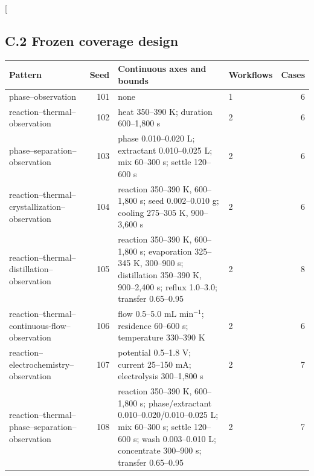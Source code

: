 \documentclass[10pt,twocolumn]{article}
\begin{document}
\clearpage
\twocolumn[
\begin{@twocolumnfalse}
\subsection{C.2 Frozen coverage design}\label{appendix-c.2-frozen-coverage-design}
\centering
\scriptsize
\captionsetup{hypcap=false}
\label{tab:coverage-design}
\begin{tabularx}{\textwidth}{@{}L{0.21\textwidth}rYL{0.10\textwidth}r@{}}
\toprule
Pattern & Seed & Continuous axes and bounds & Workflows & Cases \\
\midrule
phase--observation & 101 & none & 1 & 6 \\
reaction--thermal--observation & 102 & heat 350--390 K; duration 600--1,800 s & 2 & 6 \\
phase--separation--observation & 103 & phase 0.010--0.020 L; extractant 0.010--0.025 L; mix 60--300 s; settle 120--600 s & 2 & 6 \\
reaction--thermal--crystallization--observation & 104 & reaction 350--390 K, 600--1,800 s; seed 0.002--0.010 g; cooling 275--305 K, 900--3,600 s & 2 & 6 \\
reaction--thermal--distillation--observation & 105 & reaction 350--390 K, 600--1,800 s; evaporation 325--345 K, 300--900 s; distillation 350--390 K, 900--2,400 s; reflux 1.0--3.0; transfer 0.65--0.95 & 2 & 8 \\
reaction--thermal--continuous-flow--observation & 106 & flow 0.5--5.0 mL min$^{-1}$; residence 60--600 s; temperature 330--390 K & 2 & 6 \\
reaction--electrochemistry--observation & 107 & potential 0.5--1.8 V; current 25--150 mA; electrolysis 300--1,800 s & 2 & 7 \\
reaction--thermal--phase--separation--observation & 108 & reaction 350--390 K, 600--1,800 s; phase/extractant 0.010--0.020/0.010--0.025 L; mix 60--300 s; settle 120--600 s; wash 0.003--0.010 L; concentrate 300--900 s; transfer 0.65--0.95 & 2 & 7 \\
\bottomrule
\end{tabularx}
\par\medskip

\end{@twocolumnfalse}
\end{document}
